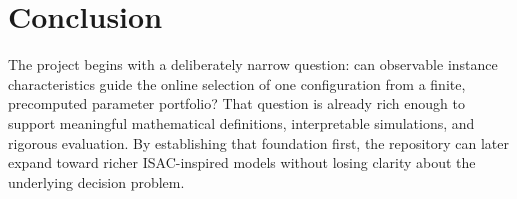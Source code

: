 \documentclass[11pt]{report}
\begin{document}
\chapter{Conclusion}

The project begins with a deliberately narrow question: can observable instance characteristics guide the online selection of one configuration from a finite, precomputed parameter portfolio? That question is already rich enough to support meaningful mathematical definitions, interpretable simulations, and rigorous evaluation. By establishing that foundation first, the repository can later expand toward richer ISAC-inspired models without losing clarity about the underlying decision problem.
\end{document}
